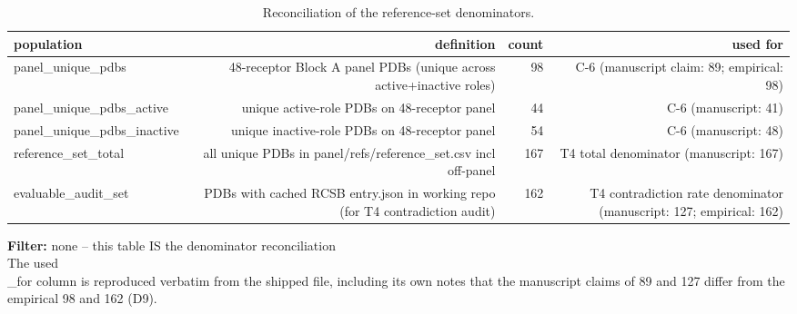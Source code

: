 \begin{table}[htbp]
\centering
\footnotesize
\caption{Reconciliation of the reference-set denominators.}
\label{tab:s_t3_denominators}
\begin{tabular}{lrrr}
\toprule
population & definition & count & used for \\
\midrule
panel\_unique\_pdbs & 48-receptor Block A panel PDBs (unique across active+inactive roles) & 98 & C-6 (manuscript claim: 89; empirical: 98) \\
panel\_unique\_pdbs\_active & unique active-role PDBs on 48-receptor panel & 44 & C-6 (manuscript: 41) \\
panel\_unique\_pdbs\_inactive & unique inactive-role PDBs on 48-receptor panel & 54 & C-6 (manuscript: 48) \\
reference\_set\_total & all unique PDBs in panel/refs/reference\_set.csv incl off-panel & 167 & T4 total denominator (manuscript: 167) \\
evaluable\_audit\_set & PDBs with cached RCSB entry.json in working repo (for T4 contradiction audit) & 162 & T4 contradiction rate denominator (manuscript: 127; empirical: 162) \\
\bottomrule
\end{tabular}
\begin{flushleft}\scriptsize
\textbf{Filter:} none -- this table IS the denominator reconciliation
 \\ The used\\_for column is reproduced verbatim from the shipped file, including its own notes that the manuscript claims of 89 and 127 differ from the empirical 98 and 162 (D9).
\end{flushleft}
\end{table}
